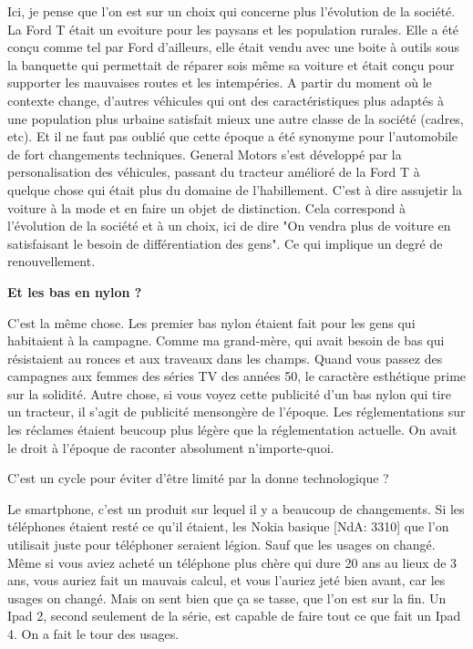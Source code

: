 \begin{small}
Ici, je pense que l'on est sur un choix qui concerne plus l'évolution de la société.
La Ford T était un evoiture pour les paysans et les population rurales. Elle a été conçu comme tel par Ford d'ailleurs, elle était vendu avec une boite à outils sous la banquette qui permettait de réparer sois même sa voiture et était conçu pour supporter les mauvaises routes et les intempéries.
A partir du moment où le contexte change, d'autres véhicules qui ont des caractéristiques plus adaptés à une population plus urbaine satisfait mieux une autre classe de la société (cadres, etc).
Et il ne faut pas oublié que cette époque a été synonyme pour l'automobile de fort changements techniques. General Motors s'est développé par la personalisation des véhicules, passant du tracteur amélioré de la Ford T à quelque chose qui était plus du domaine de l'habillement. C'est à dire assujetir la voiture à la mode et en faire un objet de distinction.
Cela correspond à l'évolution de la société et à un choix, ici de dire "On vendra plus de voiture en satisfaisant le besoin de différentiation des gens". Ce qui implique un degré de renouvellement.

\textbf{Et les bas en nylon ?}
\smallbreak


C'est la même chose. Les premier bas nylon étaient fait pour les gens qui habitaient à la campagne. Comme ma grand-mère, qui avait besoin de bas qui résistaient au ronces et aux traveaux dans les champs.
Quand vous passez des campagnes aux femmes des séries TV des années 50, le caractère esthétique prime sur la solidité. Autre chose, si vous voyez cette publicité d'un bas nylon qui tire un tracteur, il s'agit de publicité mensongère de l'époque. Les réglementations sur les réclames étaient beucoup plus légère que la réglementation actuelle. On avait le droit à l'époque de raconter absolument n'importe-quoi.

C'est un cycle pour éviter d'être limité par la donne technologique ?

Le smartphone, c'est un produit sur lequel il y a beaucoup de changements. Si les téléphones étaient resté ce qu'il étaient, les Nokia basique [NdA: 3310] que l'on utilisait juste pour téléphoner seraient légion. Sauf que les usages on changé. Même si vous aviez acheté un téléphone plus chère qui dure 20 ans au lieux de 3 ans, vous auriez fait un mauvais calcul, et vous l'auriez jeté bien avant, car les usages on changé. Mais on sent bien que ça se tasse, que l'on est sur la fin. Un Ipad 2, second seulement de la série, est capable de faire tout ce que fait un Ipad 4. On a fait le tour des usages.


\end{small}
